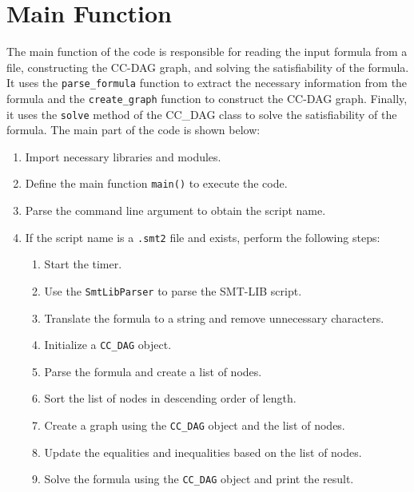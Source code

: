 \documentclass[11pt]{report}
\begin{document}
\section*{Main Function}
The main function of the code is responsible for reading the input formula from a file, constructing the CC-DAG graph, and solving the satisfiability of the formula. It uses the \texttt{parse\_formula} function to extract the necessary information from the formula and the \texttt{create\_graph} function to construct the CC-DAG graph. Finally, it uses the \texttt{solve} method of the CC\_DAG class to solve the satisfiability of the formula.
The main part of the code is shown below:
\begin{enumerate}
    \item Import necessary libraries and modules.
    \item Define the main function \texttt{main()} to execute the code.
    
    \item Parse the command line argument to obtain the script name.
    
    \item If the script name is a \texttt{.smt2} file and exists, perform the following steps:
    \begin{enumerate}
        \item Start the timer.
        
        \item Use the \texttt{SmtLibParser} to parse the SMT-LIB script.
        
        \item Translate the formula to a string and remove unnecessary characters.
        
        \item Initialize a \texttt{CC\_DAG} object.
        
        \item Parse the formula and create a list of nodes.
        
        \item Sort the list of nodes in descending order of length.
        
        \item Create a graph using the \texttt{CC\_DAG} object and the list of nodes.
        
        \item Update the equalities and inequalities based on the list of nodes.
        
        \item Solve the formula using the \texttt{CC\_DAG} object and print the result.
        

\end{enumerate}
\end{enumerate}
\end{document}
